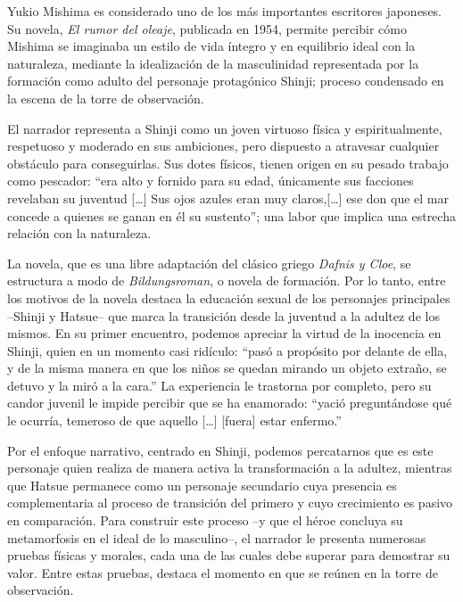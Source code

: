 Yukio Mishima es considerado uno de los más importantes escritores japoneses.
Su novela, \emph{El rumor del oleaje}, publicada en 1954, permite percibir cómo Mishima se imaginaba un estilo de vida íntegro y en equilibrio ideal con la naturaleza, mediante la idealización de la masculinidad representada por la formación como adulto del personaje protagónico Shinji; proceso condensado en la escena de la torre de observación.

El narrador representa a Shinji como un joven virtuoso física y espiritualmente, respetuoso y moderado en sus ambiciones, pero dispuesto a atravesar cualquier obstáculo para conseguirlas. Sus dotes físicos, tienen origen en su pesado trabajo como pescador: ``era alto y fornido para su edad, únicamente sus facciones revelaban su juventud [\ldots] Sus ojos azules eran muy claros,[\ldots] ese don que el mar concede a quienes se ganan en él su sustento''\autocite{mishima2006}; una labor que implica una estrecha relación con la naturaleza.

La novela, que es una libre adaptación del clásico griego \emph{Dafnis y Cloe}, se estructura a modo de \emph{Bildungsroman}, o novela de formación.
Por lo tanto, entre los motivos de la novela destaca la educación sexual de los personajes principales --Shinji y Hatsue-- que marca la transición desde la juventud a la adultez de los mismos.
En su primer encuentro, podemos apreciar la virtud de la inocencia en Shinji, quien en un momento casi ridículo: ``pasó a propósito por delante de ella, y de la misma manera en que los niños se quedan mirando un objeto extraño, se detuvo y la miró a la cara.''\autocite{mishima2006}
La experiencia le trastorna por completo, pero su candor juvenil le impide percibir que se ha enamorado: ``yació preguntándose qué le ocurría, temeroso de que aquello [\ldots] [fuera] estar enfermo.''\autocite{mishima2006}

Por el enfoque narrativo, centrado en Shinji, podemos percatarnos que es este personaje quien realiza de manera activa la transformación a la adultez, mientras que Hatsue permanece como un personaje secundario cuya presencia es complementaria al proceso de transición del primero y cuyo crecimiento es pasivo en comparación.
Para construir este proceso --y que el héroe concluya su metamorfosis en el ideal de lo masculino--, el narrador le presenta numerosas pruebas físicas y morales, cada una de las cuales debe superar para demostrar su valor. Entre estas pruebas, destaca el momento en que se reúnen en la torre de observación. 

